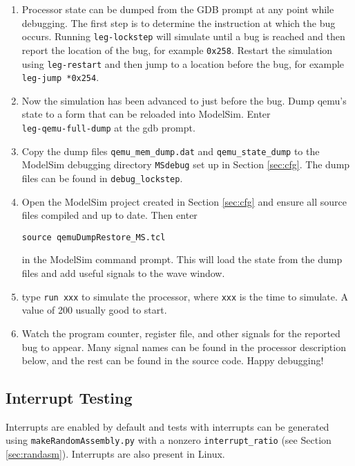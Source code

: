 \begin{enumerate}
\item Processor state can be dumped from the GDB prompt at any point while debugging.
 The first step is to determine the instruction at which the bug occurs.
 Running \texttt{leg-lockstep} will simulate until a bug is reached and then report the location of the bug, for example \texttt{0x258}.
 Restart the simulation using \texttt{leg-restart} and then jump to a location before the bug, for example \texttt{leg-jump *0x254}.
 
\item Now the simulation has been advanced to just before the bug. Dump qemu's state to a form that can be reloaded into ModelSim. Enter \\\texttt{leg-qemu-full-dump} at the gdb prompt.

\item Copy the dump files \texttt{qemu\_mem\_dump.dat} and \texttt{qemu\_state\_dump} to the ModelSim debugging directory \texttt{MSdebug} set up in Section \ref{sec:cfg}.
The dump files can be found in \texttt{debug\_lockstep}.

\item Open the ModelSim project created in Section \ref{sec:cfg} and ensure all source files compiled and up to date.
Then enter 
\begin{verbatim}source qemuDumpRestore_MS.tcl\end{verbatim}
in the ModelSim command prompt.
This will load the state from the dump files and add useful signals to the wave window. 

\item type \texttt{run xxx} to simulate the processor, where \texttt{xxx} is the time to simulate. 
A value of 200 usually good to start.

\item Watch the program counter, register file, and other signals for the reported bug to appear. 
Many signal names can be found in the processor description below, and the rest can be found in the source code.
Happy debugging!
\end{enumerate}

\subsection{Interrupt Testing}
Interrupts are enabled by default and tests with interrupts can be generated using \texttt{makeRandomAssembly.py} with a nonzero \texttt{interrupt\_ratio} (see Section \ref{sec:randasm}).
Interrupts are also present in Linux.

